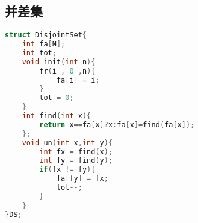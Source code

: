 \subsection{并差集}
		\begin{lstlisting}[language=c++]
struct DisjointSet{  
    int fa[N];  
    int tot;   
    void init(int n){  
        fr(i , 0 ,n){  
            fa[i] = i;  
        }  
        tot = 0;  
    }  
    int find(int x){  
        return x==fa[x]?x:fa[x]=find(fa[x]);  
    };  
    void un(int x,int y){  
        int fx = find(x);  
        int fy = find(y);  
        if(fx != fy){  
            fa[fy] = fx;  
            tot--;  
        }  
    }  
}DS;  
	\end{lstlisting}